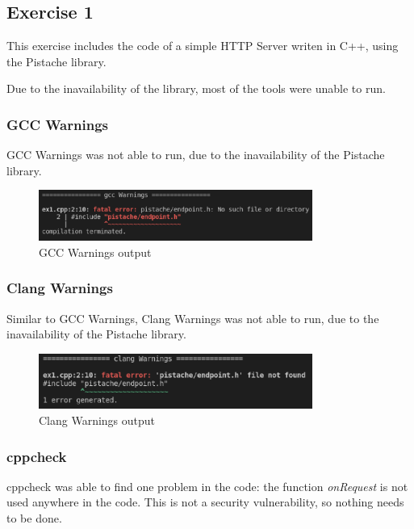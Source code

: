 \documentclass{article}
\begin{document}
\subsection{Exercise 1}

This exercise includes the code of a simple HTTP Server writen in C++, using the Pistache library.

Due to the inavailability of the library, most of the tools were unable to run.

\subsubsection{GCC Warnings}

GCC Warnings was not able to run, due to the inavailability of the Pistache library.

\begin{figure}[ht!]
    \centering
    \includegraphics[width=0.8\textwidth]{images/ex1/gccWarnings.png}
    \caption{GCC Warnings output}\label{fig:ex1/gccWarnings}
\end{figure}

\subsubsection{Clang Warnings}

Similar to GCC Warnings, Clang Warnings was not able to run, due to the inavailability of the Pistache library.

\begin{figure}[ht!]
    \centering
    \includegraphics[width=0.8\textwidth]{images/ex1/clangWarnings.png}
    \caption{Clang Warnings output}\label{fig:ex1/clangWarnings}
\end{figure}

\subsubsection{cppcheck}

cppcheck was able to find one problem in the code: the function \textit{onRequest} is not used anywhere in the code. This is not a security vulnerability, so nothing needs to be done.
\end{document}
